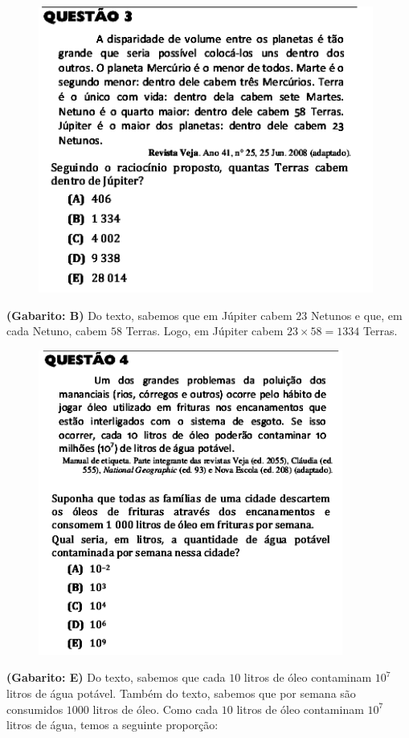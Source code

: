 \documentclass[a4paper]{article}
\begin{document}
\begin{figure}[H]
	\begin{center}
		\includegraphics[width=11cm]{L2Q3.png}
	\end{center}
\end{figure}
\par\textbf{(Gabarito: B)} Do texto, sabemos que em Júpiter cabem $23$ Netunos e que, em cada Netuno, cabem $58$ Terras. Logo, em Júpiter cabem $23\times 58 = 1334$ Terras.
\begin{figure}[H]
	\begin{center}
		\includegraphics[width=10cm]{L2Q4.png}
	\end{center}
\end{figure}
\par\textbf{(Gabarito: E)} Do texto, sabemos que cada $10$ litros de óleo contaminam $10^7$ litros de água potável. Também do texto, sabemos que por semana são consumidos $1000$ litros de óleo. Como cada $10$ litros de óleo contaminam $10^7$ litros de água, temos a seguinte proporção:
\end{document}
